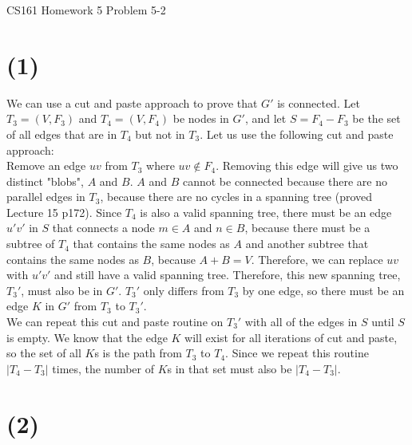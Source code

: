 \documentclass[12pt]{article}
\begin{document}
\begin{center}
{\Large CS161 Homework 5 Problem 5-2}

\end{center}

\section*{(1)}
We can use a cut and paste approach to prove that $G'$ is connected. Let $T_3 = (V, F_3)$ and $T_4 = (V, F_4)$ be nodes in $G'$, and let $S = F_4-F_3$ be the set of all edges that are in $T_4$ but not in $T_3$. Let us use the following cut and paste approach: \\
Remove an edge $uv$ from $T_3$ where $uv \notin F_4$. Removing this edge will give us two distinct "blobs", $A$ and $B$. $A$ and $B$ cannot be connected because there are no parallel edges in $T_3$, because there are no cycles in a spanning tree (proved Lecture 15 p172). Since $T_4$ is also a valid spanning tree, there must be an edge $u'v'$ in $S$ that connects a node $m \in A$ and $n \in B$, because there must be a subtree of $T_4$ that contains the same nodes as $A$ and another subtree that contains the same nodes as $B$, because $A + B = V$. Therefore, we can replace $uv$ with $u'v'$ and still have a valid spanning tree. Therefore, this new spanning tree, $T_3'$, must also be in $G'$. $T_3'$ only differs from $T_3$ by one edge, so there must be an edge $K$ in $G'$ from $T_3$ to $T_3'$.\\
We can repeat this cut and paste routine on $T_3'$ with all of the edges in $S$ until $S$ is empty. We know that the edge $K$ will exist for all iterations of cut and paste, so the set of all $K$s is the path from $T_3$ to $T_4$. Since we repeat this routine $|T_4-T_3|$ times, the number of $K$s in that set must also be $|T_4-T_3|$.

\section*{(2)}
\end{document}
